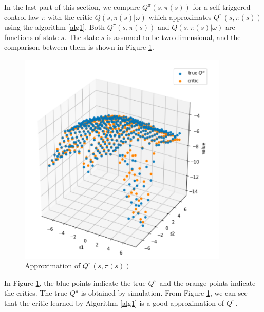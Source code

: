 \documentclass[english, dvipdfmx]{ampmt}             %
\begin{document}
In the last part of this section, we compare $Q^{\pi}(s, \pi(s))$ for a self-triggered control law $\pi$ with the critic $Q(s,\pi(s)|\omega)$ which approximates $Q^{\pi}(s, \pi(s))$ using the algorithm \ref{alg1}. Both $Q^{\pi}(s, \pi(s))$ and $Q(s, \pi(s)|\omega)$ are functions of state $s$. The state $s$ is assumed to be two-dimensional, and the comparison between them is shown in Figure \ref{Q_approximation}. 
\begin{figure}[H]
	\centering
 	\includegraphics[width=10cm]{Q_approximation.png}
 	\caption{Approximation of $Q^{\pi}(s,\pi(s))$} \label{Q_approximation}
\end{figure}
In Figure \ref{Q_approximation}, the blue points indicate the true $Q^{\pi}$ and the orange points indicate the critics. The true $Q^{\pi}$ is obtained by simulation. From Figure \ref{Q_approximation}, we can see that the critic learned by Algorithm \ref{alg1} is a good approximation of $Q^{\pi}$.
\end{document}
